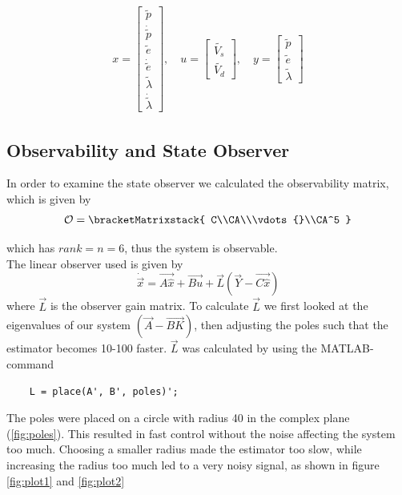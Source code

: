 \begin{align}
    x = \begin{bmatrix}
        \tilde{p}\\
        \dot{\tilde{p}}\\
        \tilde{e}\\
        \dot{\widetilde{e}}\\
        \tilde{\lambda}\\
        \dot{\tilde{\lambda}} 
        \end{bmatrix}, \quad
    u = \begin{bmatrix}
        \tilde{V_s}\\
        \tilde{V_d} 
        \end{bmatrix}, \quad
    y = \begin{bmatrix}    
        \tilde{p}\\
        \tilde{e}\\
        \tilde{\lambda} 
        \end{bmatrix}
\end{align}



\subsection{Observability and State Observer}
In order to examine the state observer we calculated the observability matrix, which is given by
\begin{equation*}
    \mathcal{O} = 
    \bracketMatrixstack{
        C\\CA\\\vdots{}\\CA^5    
    }
\end{equation*}

which has $ rank = n = 6 $, thus the system is observable.\\
The linear observer used is given by
%
\begin{equation*}
    \dot{\vec{x}} = \vec{A\hat{x}} + \vec{Bu} + \vec{L}(\vec{Y} - \vec{C\hat{x}})
\end{equation*}
%
where $\vec{L}$ is the observer gain matrix. 
To calculate $\vec{L}$ we first looked at the eigenvalues of our system $(\vec{A}-\vec{BK})$, then adjusting the poles such that the estimator becomes 10-100 faster. $\vec{L}$ was calculated by using the MATLAB-command
%
\begin{lstlisting}  
    L = place(A', B', poles)';
\end{lstlisting}
%
The poles were placed on a circle with radius 40 in the complex plane (\cref{fig:poles}). This resulted in fast control without the noise affecting the system too much. Choosing a smaller radius made the estimator too slow, while increasing the radius too much led to a very noisy signal, as shown in figure \cref{fig:plot1} and \cref{fig:plot2}


